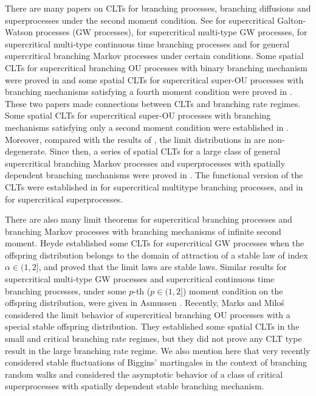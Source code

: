\documentclass[12pt,a4paper]{amsart}
\theoremstyle{plain}
\theoremstyle{definition}
\numberwithin{equation}{section}
\begin{document}
There are many papers on CLTs for branching processes, branching diffusions and superprocesses under the second moment condition.
See \cite{Heyde1970A-rate, HeydeBrown1871An-invariance, HeydeLeslie1971Improved} for supercritical Galton-Watson processes (GW processes),
\cite{KestenStigum1966Additional,KestenStigum1966A-limit} for supercritical multi-type GW processes, \cite{Athreya1969Limit,Athreya1969LimitB,Athreya1971Some}
for supercritical multi-type continuous time branching processes and \cite{AsmussenHering1983Branching} for general supercritical branching Markov processes under certain conditions.
Some spatial CLTs for supercritical branching OU processes with binary branching mechanism were proved in \cite{AdamczakMilos2015CLT} and some
spatial CLTs for supercritical super-OU processes with branching mechanisms satisfying a fourth moment condition were proved in \cite{Milos2012Spatial}.
These two papers made connections between CLTs and branching rate regimes.
Some spatial CLTs  for supercritical super-OU  processes with branching mechanisms satisfying only a second moment condition were established in \cite{RenSongZhang2014Central}.
Moreover, compared with the results of \cite{AdamczakMilos2015CLT,Milos2012Spatial}, the limit distributions in \cite{RenSongZhang2014Central} are non-degenerate.
Since then, a series of spatial CLTs for a large class of general supercritical branching Markov processes and superprocesses with spatially dependent branching mechanisms were proved in \cite{RenSongZhang2014CentralB,RenSongZhang2015Central,RenSongZhang2017Central}.
The functional version of the CLTs were established in \cite{Janson2004Functional} for supercritical multitype branching processes, and in \cite{RenSongZhang2017Functional} for supercritical superprocesses.


There are also many limit theorems for supercritical branching processes and branching Markov processes with branching mechanisms of infinite second moment.
Heyde \cite{Heyde1971Some} established some  CLTs for supercritical GW processes when the offspring distribution belongs to the domain of attraction of a stable law of index $\alpha\in (1, 2]$, and proved that the limit laws are stable laws.
Similar results  for supercritical multi-type GW processes and supercritical continuous time branching processes,
under some $p$-th ($p\in(1,2]$) moment condition on the offspring distribution, were given in Asmussen \cite{Asmussen76Convergence}.
 Recently, Marks and Milo\'s \cite{MarksMilos2018CLT} considered the limit behavior of supercritical branching OU processes with a special stable offspring distribution.
They established some spatial CLTs in the small and critical branching rate regimes, but they did not prove any CLT type result in the large branching rate regime.
We also mention here that very recently \cite{IksanovKoleskoMeiners2018Stable-like} considered stable fluctuations of Biggins' martingales in the context of branching random walks and \cite{RenSongSun2018Limit} considered the asymptotic behavior
of a class of critical superprocesses with spatially dependent stable branching mechanism.
\end{document}
